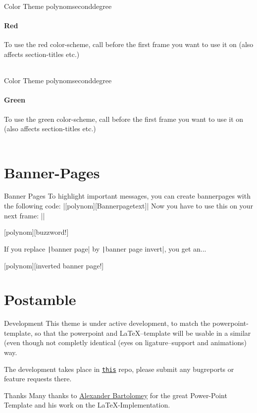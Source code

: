 \documentclass[fragile=singleslide]{beamer}
\begin{document}
\setPaletteRed
\begin{frame}{Color Theme polynomseconddegree}
  \framesubtitle{Red}

  To use the red color-scheme, call \texttt{\setPaletteRed}
  before the first frame you want to use it on (also affects
  section-titles etc.) \\
  \paletteColors\\
  
\end{frame}

\setPaletteGreen
\begin{frame}{Color Theme polynomseconddegree}
  \framesubtitle{Green}

  To use the green color-scheme, call \texttt{\setPaletteGreen}
  before the first frame you want to use it on (also affects
  section-titles etc.) \\
  \paletteColors\\
  
\end{frame}
\setPaletteBlue

\section{Banner-Pages}
\begin{frame}{Banner Pages}
  To highlight important messages, you can create bannerpages with the
  following code:
  |[polynom][Bannerpagetext]|
  Now you have to use this on your next frame:
  ||
\end{frame}

[polynom][buzzword!]
\begin{frame}
\end{frame}

\begin{frame}
  If you replace \texttt|banner page| by
  \texttt|banner page invert|, you get an...
\end{frame}


[polynom][inverted banner page!]
\begin{frame}
\end{frame}


\section{Postamble}
\begin{frame}{Development}
  This theme is under active development, to match the
  powerpoint-template, so that the powerpoint and LaTeX--template will
  be usable in a similar (even though not completly identical (eyes on
  ligature--support and animations) way.

  The development takes place in
  \href{https://git.rwth-aachen.de/ACHinrichs/LaTeX-templates/}{\texttt{this}}
  repo, please submit any bugreports or feature requests there.
\end{frame}

\begin{frame}{Thanks}
  Many thanks to \href{https://www.occloxium.com/}{Alexander Bartolomey} for the great Power-Point
  Template and his work on the LaTeX-Implementation. 
\end{frame}
\end{document}
